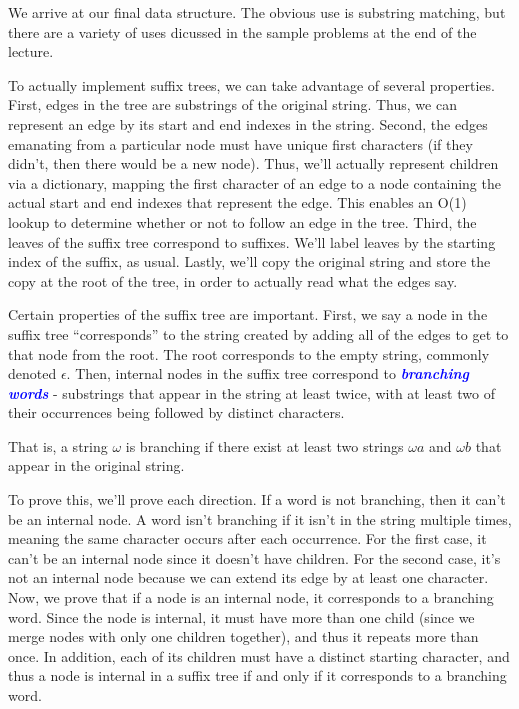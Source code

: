 \documentclass[11pt, oneside]{article}
\newcommand{\emphasis}[1]{\textcolor{blue}{\textbf{\textit{#1}}}}
\begin{document}
We arrive at our final data structure. The obvious use is substring matching,
but there are a variety of uses dicussed in the sample problems at the end of the lecture.

To actually implement suffix trees, we can take advantage of several properties.
First, edges in the tree are substrings of the original string.
Thus, we can represent an edge by its start and end indexes in the string.
Second, the edges emanating from a particular node must have unique first characters
(if they didn't, then there would be a new node).
Thus, we'll actually represent children via a dictionary, mapping the first character
of an edge to a node containing the actual start and end indexes that represent the edge.
This enables an O(1) lookup to determine whether or not to follow an edge in the tree.
Third, the leaves of the suffix tree correspond to suffixes.
We'll label leaves by the starting index of the suffix, as usual.
Lastly, we'll copy the original string and store the copy at the root of the tree,
in order to actually read what the edges say.

Certain properties of the suffix tree are important.
First, we say a node in the suffix tree ``corresponds'' to the string created by adding all of the edges to get to that node from the root.
The root corresponds to the empty string, commonly denoted \( \epsilon \).
Then, internal nodes in the suffix tree correspond to \emphasis{branching words} - substrings that appear in the string at least twice, with at least two of their occurrences being followed by distinct characters.

That is, a string \( \omega \) is branching if there exist at least two strings \( \omega a \) and \( \omega b \) that appear in the original string.

To prove this, we'll prove each direction. If a word is not branching, then it can't be an internal node.
A word isn't branching if it isn't in the string multiple times, meaning the same character occurs after each occurrence.
For the first case, it can't be an internal node since it doesn't have children.
For the second case, it's not an internal node because we can extend its edge by at least one character.
Now, we prove that if a node is an internal node, it corresponds to a branching word.
Since the node is internal, it must have more than one child (since we merge nodes with only one children together),
and thus it repeats more than once. In addition, each of its children must have a distinct starting character,
and thus a node is internal in a suffix tree if and only if it corresponds to a branching word.
\end{document}
